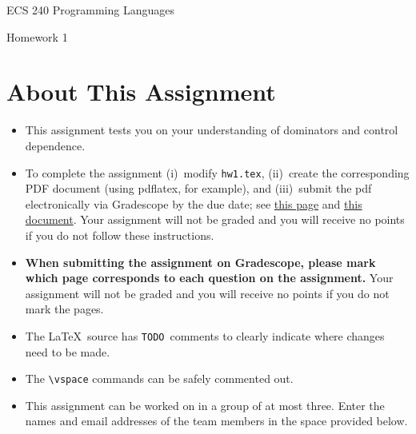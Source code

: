\documentclass[12pt]{article}
\begin{document}

\begin{center}
    \bigskip
    {\LARGE ECS 240 Programming Languages} \medskip
    
    {\Large Homework 1} \bigskip

\end{center}

\section*{About This Assignment}

\begin{itemize}
  \item This assignment tests you on your understanding of dominators and
  control dependence.
  \item To complete the assignment (i)~modify \texttt{hw1.tex}, (ii)~create
  the corresponding PDF document (using pdflatex, for example), and
  (iii)~submit the pdf electronically via Gradescope by the due date; see
  \href{https://www.gradescope.com/get_started#student-submission}{this page}
  and
  \href{http://gradescope-static-assets.s3-us-west-2.amazonaws.com/help/submitting_hw_guide.pdf}{this
  document}. Your assignment will not be graded and you will receive no
  points if you do not follow these instructions. 

  \item \textbf{When submitting the assignment on Gradescope, please mark
  which page corresponds to each question on the assignment.}  Your
  assignment will not be graded and you will receive no points if you do not
  mark the pages.      

  \item The  \LaTeX\ source has \texttt{TODO}~comments to clearly indicate
  where changes need to be made. 
  \item The \verb=\vspace= commands can be safely commented out.
  \item This assignment can be worked on in a group of at most three. Enter
  the names and email addresses of the team members in the space provided
  below.
\end{itemize}
\end{document}
